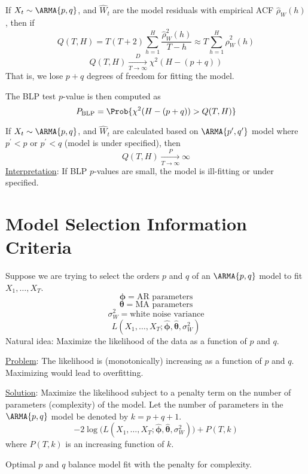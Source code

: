 If $ X_t \sim \ARMA{p,q} $, and $ \hat{W}_t $ are the model residuals
with empirical ACF $ \hat{\rho}_W(h) $, then if
\[ Q(T,H)=T(T+2)\sum_{h=1}^{H} \frac{\hat{\rho}_W^2(h)}{T-h}\approx
    T \sum_{h=1}^{H} \hat{\rho}_W^2(h)  \]
\[ Q(T,H)\xrightarrow[T\to\infty]{D}\chi^2(H-(p+q)) \]
That is, we lose $ p+q $ degrees of freedom for fitting the model.

The BLP test $ p $-value is then computed as
\[ P_{\text{BLP}}=\Prob{\chi^2(H-(p+q))>Q(T,H)} \]

\begin{Remark}{}{}
    If $ X_t \sim \ARMA{p,q} $, and $ \hat{W}_t $
    are calculated based on $ \ARMA{p^\prime,q^\prime} $ model
    where $ p^\prime <p $ or $ p^\prime <q $ (model is under specified),
    then
    \[ Q(T,H)\xrightarrow[T\to\infty]{P}\infty \]
    \underline{Interpretation}: If BLP $ p $-values are small,
    the model is ill-fitting or under specified.
\end{Remark}

\section{Model Selection Information Criteria}
Suppose we are trying to select the orders $ p $ and
$ q $ of an $ \ARMA{p,q} $ model to fit $ X_1,\ldots,X_T $.
\[ \symbf{\phi}=\text{AR parameters} \]
\[ \symbf{\theta}=\text{MA parameters} \]
\[ \sigma_W^2=\text{white noise variance} \]
\[ L(X_1,\ldots,X_T;\hat{\symbf{\phi}},\hat{\symbf{\theta}},\sigma_W^2) \]
Natural idea: Maximize the likelihood of the data as a function of
$ p $ and $ q $.

\underline{Problem}: The likelihood is (monotonically)
increasing as a function of $ p $ and $ q $. Maximizing would lead
to overfitting.

\underline{Solution}: Maximize the likelihood subject to a
penalty term on the number of parameters (complexity)
of the model. Let the number of parameters
in the $ \ARMA{p,q} $ model be denoted by $ k=p+q+1 $.
\[ -2\log\bigl(L(X_1,\ldots,X_T;\hat{\symbf{\phi}},\hat{\symbf{\theta}},\sigma_W^2)\bigr)+P(T,k) \]
where $ P(T,k) $ is an increasing function of $ k $.

Optimal $ p $ and $ q $ balance model fit with the penalty for complexity.

